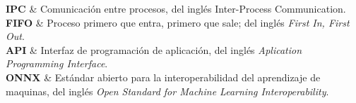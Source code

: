 \documentclass[hidelinks, letterpaper, 12pt, oneside]{tesis}
\begin{document}
{    \textbf{IPC}  & Comunicación entre procesos, del inglés Inter-Process Communication.  \\

    \textbf{FIFO} & Proceso primero que entra, primero que sale; del inglés \textit{First In, First Out}. \\

    \textbf{API} & Interfaz de programación de aplicación, del inglés \textit{Aplication Programming Interface}. \\
    
    \textbf{ONNX} & Estándar abierto para la interoperabilidad del aprendizaje de maquinas, del inglés \textit{Open Standard for Machine Learning Interoperability}. \\
    
    
    \hline
}





\pagestyle{empty}  %


\mainmatter
\pagestyle{fancy}










\label{Bibliography}

%



\appendix
% 
%
%

\backmatter
\end{document}
